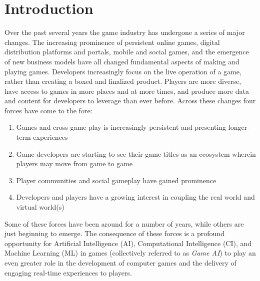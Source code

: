 \documentclass[conference]{IEEEtran}
\begin{document}

\section{Introduction}
Over the past several years the game industry has undergone a series of major changes. 
The increasing prominence of persistent online games, digital distribution platforms and portals, mobile and social games, and the emergence of new business models have all changed fundamental aspects of making and playing games. 
Developers increasingly focus on the live operation of a game, rather than creating a boxed and finalized product.
Players are more diverse, have access to games in more places and at more times, and produce more data and content for developers to leverage than ever before. Across these changes four forces have come to the fore:
\begin{enumerate}
\item Games and cross-game play is increasingly persistent and presenting longer-term experiences %
\item Game developers are starting to see their game titles as an ecosystem wherein players may move from game to game %
\item Player communities and social gameplay have gained prominence
\item Developers and players have a growing interest in coupling the real world and virtual world(s) %
\end{enumerate}
\noindent
Some of these forces have been around for a number of years, while others are just beginning to emerge.
The consequence of these forces is a profound opportunity for Artificial Intelligence (AI), Computational Intelligence (CI), and Machine Learning (ML) in games (collectively referred to as {\em Game AI}) to play an even greater role in the development of computer games and the delivery of engaging real-time experiences to players. 
\end{document}
